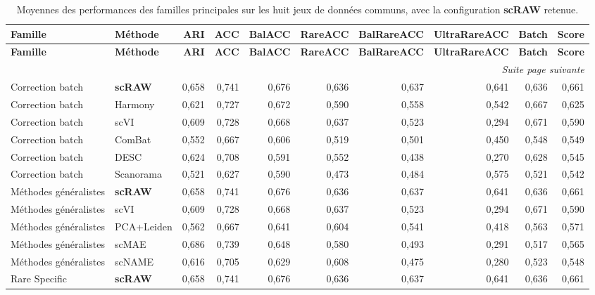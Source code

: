 {\scriptsize
\setlength{\tabcolsep}{3pt}
\renewcommand{\arraystretch}{1.12}
\begin{longtable}{p{}p{}rrrrrrrr}
\caption{Moyennes des performances des familles principales sur les huit jeux de données communs, avec la configuration \textbf{scRAW} retenue.}\label{tab:common8_primary_all_methods_means}\\
\toprule
\textbf{Famille} & \textbf{Méthode} & \textbf{ARI} & \textbf{ACC} & \textbf{BalACC} & \textbf{RareACC} & \textbf{BalRareACC} & \textbf{UltraRareACC} & \textbf{Batch} & \textbf{Score} \\
\midrule
\endfirsthead
\toprule
\textbf{Famille} & \textbf{Méthode} & \textbf{ARI} & \textbf{ACC} & \textbf{BalACC} & \textbf{RareACC} & \textbf{BalRareACC} & \textbf{UltraRareACC} & \textbf{Batch} & \textbf{Score} \\
\midrule
\endhead
\midrule
\multicolumn{10}{r}{\textit{Suite page suivante}}\\
\endfoot
\bottomrule
\endlastfoot
Correction batch & \textbf{scRAW} & 0,658 & 0,741 & 0,676 & 0,636 & 0,637 & 0,641 & 0,636 & 0,661 \\
Correction batch & Harmony & 0,621 & 0,727 & 0,672 & 0,590 & 0,558 & 0,542 & 0,667 & 0,625 \\
Correction batch & scVI & 0,609 & 0,728 & 0,668 & 0,637 & 0,523 & 0,294 & 0,671 & 0,590 \\
Correction batch & ComBat & 0,552 & 0,667 & 0,606 & 0,519 & 0,501 & 0,450 & 0,548 & 0,549 \\
Correction batch & DESC & 0,624 & 0,708 & 0,591 & 0,552 & 0,438 & 0,270 & 0,628 & 0,545 \\
Correction batch & Scanorama & 0,521 & 0,627 & 0,590 & 0,473 & 0,484 & 0,575 & 0,521 & 0,542 \\
Méthodes généralistes & \textbf{scRAW} & 0,658 & 0,741 & 0,676 & 0,636 & 0,637 & 0,641 & 0,636 & 0,661 \\
Méthodes généralistes & scVI & 0,609 & 0,728 & 0,668 & 0,637 & 0,523 & 0,294 & 0,671 & 0,590 \\
Méthodes généralistes & PCA+Leiden & 0,562 & 0,667 & 0,641 & 0,604 & 0,541 & 0,418 & 0,563 & 0,571 \\
Méthodes généralistes & scMAE & 0,686 & 0,739 & 0,648 & 0,580 & 0,493 & 0,291 & 0,517 & 0,565 \\
Méthodes généralistes & scNAME & 0,616 & 0,705 & 0,629 & 0,608 & 0,475 & 0,280 & 0,523 & 0,548 \\
Rare Specific & \textbf{scRAW} & 0,658 & 0,741 & 0,676 & 0,636 & 0,637 & 0,641 & 0,636 & 0,661 \\

\end{longtable}}
